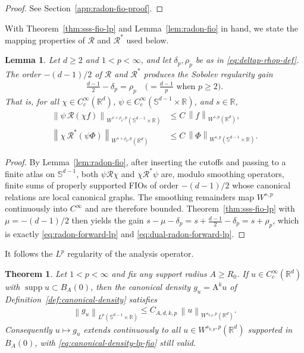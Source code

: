 \documentclass[12pt]{article}
\numberwithin{equation}{section}
\newtheorem{theorem}{Theorem}[section]
\newtheorem{lemma}{Lemma}[section]
\numberwithin{figure}{section}
\numberwithin{equation}{section}
\newcommand{\R}{\mathbb{R}}
\newcommand{\Sph}{\mathbb S}
\newcommand{\norm}[1]{\left\|#1\right\|}
\DeclareMathOperator{\supp}{supp}
\begin{document}
\begin{proof}
See Section~\ref{app:radon-fio-proof}.
\end{proof}

With Theorem~\ref{thm:sss-fio-lp} and Lemma~\ref{lem:radon-fio} in hand, we state
the mapping properties of $\mathcal R$ and $\mathcal R^*$ used below.

\begin{lemma}
\label{lem:radon-lp-mapping}
Let $d\ge2$ and $1<p<\infty$, and let $\delta_p,\rho_p$ be as in
\eqref{eq:deltap-rhop-def}. The order $-(d-1)/2$ of $\mathcal R$ and
$\mathcal R^*$ produces the Sobolev regularity gain
\begin{align}
    \frac{d-1}{2}-\delta_p=\rho_p
    \quad\bigl(=\tfrac{d-1}{p}\text{ when }p\ge2\bigr).
    \label{eq:radon-gain}
\end{align}
That is, for all $\chi\in C_c^\infty(\R^d)$, $\psi\in C_c^\infty(\Sph^{d-1}\times\R)$,
and $s\in\R$,
\begin{align}
    \norm{\psi\,\mathcal R(\chi f)}_{W^{s+\rho_p,p}(\Sph^{d-1}\times\R)}
    &\le C\,\norm{f}_{W^{s,p}(\R^d)},
    \label{eq:radon-forward-lp}\\
    \norm{\chi\,\mathcal R^*(\psi\Phi)}_{W^{s+\rho_p,p}(\R^d)}
    &\le C\,\norm{\Phi}_{W^{s,p}(\Sph^{d-1}\times\R)}.
    \label{eq:dual-radon-forward-lp}
\end{align}
\end{lemma}

\begin{proof}
By Lemma~\ref{lem:radon-fio}, after inserting the cutoffs and passing to a finite
atlas on $\Sph^{d-1}$, both $\psi\mathcal R\chi$ and $\chi\mathcal R^*\psi$ are,
modulo smoothing operators, finite sums of properly supported FIOs of order
$-(d-1)/2$ whose canonical relations are local canonical graphs. The smoothing remainders map $W^{s,p}$ continuously
into $C^\infty$ and are therefore bounded. Theorem~\ref{thm:sss-fio-lp} with
$\mu=-(d-1)/2$ then yields the gain
$s-\mu-\delta_p=s+\tfrac{d-1}{2}-\delta_p=s+\rho_p$, which is exactly
\eqref{eq:radon-forward-lp} and \eqref{eq:dual-radon-forward-lp}.
\end{proof}
It follows the $L^p$ regularity of the analysis operator.
\begin{theorem}
\label{thm:canonical-density-lp-fio}
Let $1<p<\infty$ and fix any support radius $A\ge R_0$. If $u\in C_c^\infty(\R^d)$
with $\supp u\subset B_A(0)$, then the canonical density $g_u=\mathrm{A}^k u$ of
Definition~\ref{def:canonical-density} satisfies
\begin{align}
    \norm{g_u}_{L^p(\Sph^{d-1}\times\R)}
    \le C_{A,d,k,p}\,\norm{u}_{W^{s_{k,p},p}(\R^d)}.
    \label{eq:canonical-density-lp-fio}
\end{align}
Consequently $u\mapsto g_u$ extends continuously to all $u\in W^{s_{k,p},p}(\R^d)$
supported in $B_A(0)$, with \eqref{eq:canonical-density-lp-fio} still valid.
\end{theorem}
\end{document}
